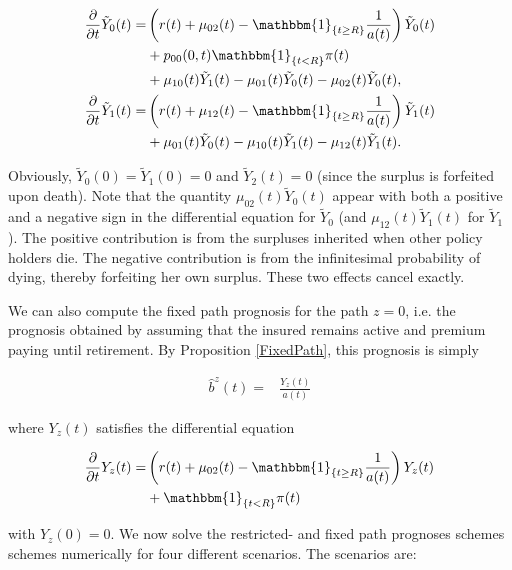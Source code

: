 \documentclass{article}
\newcommand{\1}[1]{\mathbbm{1}_{\left\lbrace #1 \right\rbrace}}
\theoremstyle{break}
\theoremstyle{remark}
\numberwithin{equation}{section}
\begin{document}
\begin{align} \label{Jaja}
\begin{split}
	\frac{\partial}{\partial t} \tilde{Y}_0(t) =& \left( r(t) + \mu_{02}(t) - \1{t \geq R} \frac{1}{a(t)}\right) \tilde{Y}_0(t) \\
	&+ p_{00}(0,t) \1{t<R} \pi(t) \\
	&+ \mu_{10}(t) \tilde{Y}_1(t) - \mu_{01}(t) \tilde{Y}_0(t) - \mu_{02}(t) \tilde{Y}_0(t), \\
	\frac{\partial}{\partial t} \tilde{Y}_1(t) =& \left( r(t) + \mu_{12}(t) - \1{t \geq R} \frac{1}{a(t)}\right) \tilde{Y}_1(t) \\
	&+ \mu_{01}(t) \tilde{Y}_0(t) - \mu_{10}(t) \tilde{Y}_1(t) - \mu_{12}(t) \tilde{Y}_1(t).
\end{split}
\end{align}

Obviously, $\tilde{Y}_0(0)=\tilde{Y}_1(0)=0$ and $\tilde{Y}_2(t)=0$ (since the surplus is forfeited upon death). Note that the quantity $\mu_{02}(t) \tilde{Y}_0(t)$ appear with both a positive and a negative sign in the differential equation for $\tilde{Y}_0$ (and $\mu_{12}(t) \tilde{Y}_1(t)$ for $\tilde{Y}_1$). The positive contribution is from the surpluses inherited when other policy holders die. The negative contribution is from the infinitesimal probability of dying, thereby forfeiting her own surplus. These two effects cancel exactly.

We can also compute the fixed path prognosis for the path $z=0$, i.e. the prognosis obtained by assuming that the insured remains active and premium paying until retirement.  By Proposition \ref{FixedPath}, this prognosis is simply

\begin{align} \label{Naja2}
	\hat{b}^z(t) =& \frac{Y_z(t)}{a(t)}
\end{align}

where $Y_z(t)$ satisfies the differential equation

\begin{align} \label{Jaja2}
\begin{split}
		\frac{\partial}{\partial t}Y_z(t) =& \left( r(t) + \mu_{02}(t) - \1{t \geq R} \frac{1}{a(t)}\right) Y_z(t) \\
	&+ \1{t<R} \pi(t)
\end{split}
\end{align}

with $Y_z(0) = 0$. We now solve the restricted- and fixed path prognoses schemes schemes numerically for four different scenarios. The scenarios are:
\end{document}
